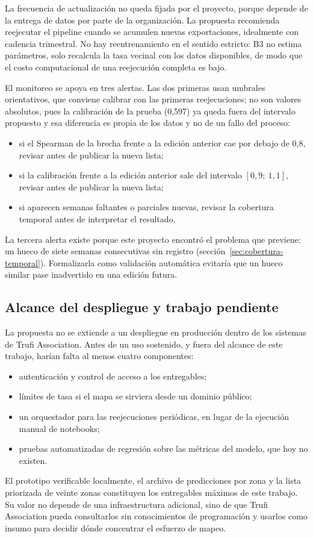 La frecuencia de actualización no queda fijada por el proyecto, porque depende de la
entrega de datos por parte de la organización. La propuesta recomienda reejecutar el
pipeline cuando se acumulen nuevas exportaciones, idealmente con cadencia trimestral. No hay
reentrenamiento en el sentido estricto: B3 no estima parámetros, solo recalcula la tasa
vecinal con los datos disponibles, de modo que el costo computacional de una reejecución
completa es bajo.

El monitoreo se apoya en tres alertas. Las dos primeras usan umbrales orientativos, que
conviene calibrar con las primeras reejecuciones; no son valores absolutos, pues la
calibración de la prueba (0,597) ya queda fuera del intervalo propuesto y esa diferencia es
propia de los datos y no de un fallo del proceso:
\begin{itemize}
  \item si el Spearman de la brecha frente a la edición anterior cae por debajo de 0,8,
        revisar antes de publicar la nueva lista;
  \item si la calibración frente a la edición anterior sale del intervalo $[0{,}9;\ 1{,}1]$,
        revisar antes de publicar la nueva lista;
  \item si aparecen semanas faltantes o parciales nuevas, revisar la cobertura temporal
        antes de interpretar el resultado.
\end{itemize}
La tercera alerta existe porque este proyecto encontró el problema que previene: un hueco de
siete semanas consecutivas sin registro (sección~\ref{sec:cobertura-temporal}). Formalizarla
como validación automática evitaría que un hueco similar pase inadvertido en una edición
futura.

\subsection{Alcance del despliegue y trabajo pendiente}
\label{sec:alcance-despliegue}

La propuesta no se extiende a un despliegue en producción dentro de los sistemas de Trufi
Association. Antes de un uso sostenido, y fuera del alcance de este trabajo, harían falta al
menos cuatro componentes:
\begin{itemize}
  \item autenticación y control de acceso a los entregables;
  \item límites de tasa si el mapa se sirviera desde un dominio público;
  \item un orquestador para las reejecuciones periódicas, en lugar de la ejecución manual de
        notebooks;
  \item pruebas automatizadas de regresión sobre las métricas del modelo, que hoy no
        existen.
\end{itemize}
El prototipo verificable localmente, el archivo de predicciones por zona y la lista
priorizada de veinte zonas constituyen los entregables máximos de este trabajo. Su valor no
depende de una infraestructura adicional, sino de que Trufi Association pueda consultarlos
sin conocimientos de programación y usarlos como insumo para decidir dónde concentrar el
esfuerzo de mapeo.
